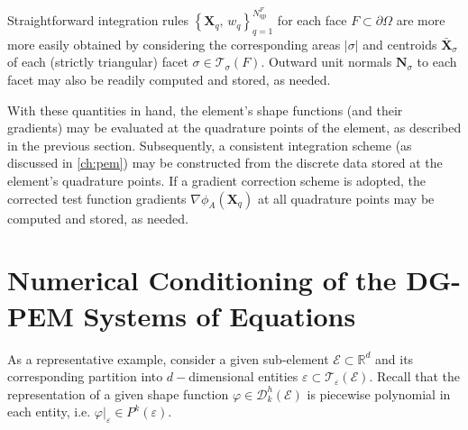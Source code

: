 	Straightforward integration rules $\left\{ \bm{X}_q, \, w_q \right\}_{q=1}^{N^F_{\mathrm q\mathrm p}}$ for each face $F \subset \partial \Omega$ are more more easily obtained by considering the corresponding areas $|\sigma|$ and centroids $\bar{\bm{X}}_\sigma$ of each (strictly triangular) facet $\sigma \in \mathcal{T}_{\sigma} (F)$. Outward unit normals $\bm{N}_\sigma$ to each facet may also be readily computed and stored, as needed.

	With these quantities in hand, the element's shape functions (and their gradients) may be evaluated at the quadrature points of the element, as described in the previous section. Subsequently, a consistent integration scheme (as discussed in \ref{ch:pem}) may be constructed from the discrete data stored at the element's quadrature points. If a gradient correction scheme is adopted, the corrected test function gradients $\nabla \phi_A (\bm{X}_q)$ at all quadrature points may be computed and stored, as needed.

\section{Numerical Conditioning of the DG-PEM Systems of Equations}

As a representative example, consider a given sub-element $\mathcal{E} \subset \mathbb{R}^d$ and its corresponding partition into $d-$dimensional entities $\varepsilon \subset \mathcal{T}_\varepsilon (\mathcal{E})$. Recall that the representation of a given shape function $\varphi \in \mathcal{D}^h_k (\mathcal{E})$ is piecewise polynomial in each entity, i.e. $\varphi|_{\varepsilon} \in P^k (\varepsilon)$.

